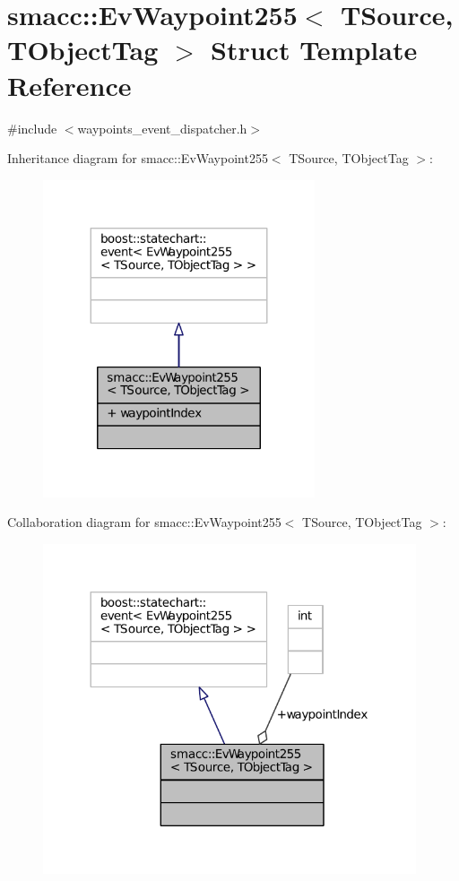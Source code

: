 \hypertarget{structsmacc_1_1EvWaypoint255}{}\section{smacc\+:\+:Ev\+Waypoint255$<$ T\+Source, T\+Object\+Tag $>$ Struct Template Reference}
\label{structsmacc_1_1EvWaypoint255}


{\ttfamily \#include $<$waypoints\+\_\+event\+\_\+dispatcher.\+h$>$}



Inheritance diagram for smacc\+:\+:Ev\+Waypoint255$<$ T\+Source, T\+Object\+Tag $>$\+:
\nopagebreak
\begin{figure}[H]
\begin{center}
\leavevmode
\includegraphics[width=227pt]{structsmacc_1_1EvWaypoint255__inherit__graph}
\end{center}
\end{figure}


Collaboration diagram for smacc\+:\+:Ev\+Waypoint255$<$ T\+Source, T\+Object\+Tag $>$\+:
\nopagebreak
\begin{figure}[H]
\begin{center}
\leavevmode
\includegraphics[width=312pt]{structsmacc_1_1EvWaypoint255__coll__graph}
\end{center}
\end{figure}
